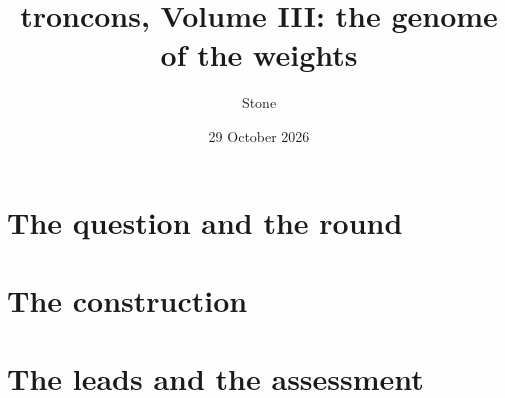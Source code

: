 \documentclass[11pt, a4paper, twoside, openright, parskip=false, headings=big,
               chapterprefix=true, numbers=noenddot, bibliography=totoc,
               listof=totoc]{scrbook}
\title{troncons, Volume III: the genome of the weights}
\author{Stone}
\date{29 October 2026}
\newcommand{\Racine}{../..}               %
\begin{document}
\frontmatter


\tableofcontents
\listoffigures
\listoftables
\lstlistoflistings


\mainmatter


\part{The question and the round}








\part{The construction}




\part{The leads and the assessment}




\appendix




\backmatter

\end{document}
